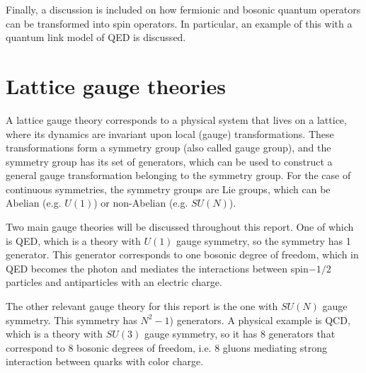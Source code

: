 \documentclass[a4paper]{report}
\begin{document}
\begin{spacing}{1.1}
Finally, a discussion is included on how fermionic and bosonic quantum operators can be transformed into spin operators. In particular, an example of this with a quantum link model of QED is discussed. 







\section{Lattice gauge theories}

A lattice gauge theory corresponds to a physical system that lives on a lattice, where its dynamics are invariant upon local (gauge) transformations. These transformations form a symmetry group (also called gauge group), and the symmetry group has its set of generators, which can be used to construct a general gauge transformation belonging to the symmetry group. For the case of continuous symmetries, the symmetry groups are Lie groups, which can be Abelian (e.g. $U(1)$) or non-Abelian (e.g. $SU(N)$).

Two main gauge theories will be discussed throughout this report. One of which is QED, which is a theory with $U(1)$ gauge symmetry, so the symmetry has 1 generator. This generator corresponds to one bosonic degree of freedom, which in QED becomes the photon and mediates the interactions between spin$-1/2$ particles and antiparticles with an electric charge.

The other relevant gauge theory for this report is the one with $SU(N)$ gauge symmetry. This symmetry has $N^2-1$) generators. A physical example is QCD, which is a theory with $SU(3)$ gauge symmetry, so it has 8 generators that correspond to 8 bosonic degrees of freedom, i.e. 8 gluons mediating strong interaction between quarks with color charge.






\end{spacing}
\end{document}
